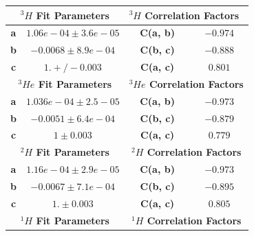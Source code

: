 \documentclass[final,5p,times,twocolumn]{elsarticle}
\begin{document}
\begin{table}[!h]
\begin{tabular}{|c|c|l|c|c|l|}
\hline
\multicolumn{3}{|c|}{\textbf{$^{3}H$ Fit Parameters}}                                & \multicolumn{3}{l|}{\textbf{$^{3}H$ Correlation Factors}}    \\ \hline
\textbf{a}              & \multicolumn{2}{c|}{$1.06e-04 \pm 3.6e-05$}                & \textbf{C(a, b)}             & \multicolumn{2}{c|}{$-0.974$} \\ \hline
\textbf{b}              & \multicolumn{2}{c|}{$-0.0068 \pm 8.9e-04$}                 & \textbf{C(b, c)}             & \multicolumn{2}{c|}{$-0.888$} \\ \hline
\textbf{c}              & \multicolumn{2}{c|}{$1. +/- 0.003$}                        & \textbf{C(a, c)}             & \multicolumn{2}{c|}{$0.801$}  \\ \hline
\multicolumn{3}{|c|}{\textbf{$^{3}He$ Fit Parameters}}                               & \multicolumn{3}{c|}{\textbf{$^{3}He$ Correlation Factors}}   \\ \hline
\textbf{a}              & \multicolumn{2}{c|}{$1.036e-04\pm 2.5-05$}                 & \textbf{C(a, b)}                      & \multicolumn{2}{c|}{$-0.973$} \\ \hline
\textbf{b}              & \multicolumn{2}{c|}{$-0.0051 \pm 6.4e-04$}                 & \textbf{C(b, c)}                      & \multicolumn{2}{c|}{$-0.879$} \\ \hline
\textbf{c}              & \multicolumn{2}{c|}{$1 \pm 0.003$}                         & \textbf{C(a, c)}                     & \multicolumn{2}{c|}{$0.779$}  \\ \hline
\multicolumn{3}{|c|}{\textbf{$^{2}H$ Fit Parameters}}                                & \multicolumn{3}{c|}{\textbf{$^{2}H$ Correlation Factors}}    \\ \hline
\textbf{a}              & \multicolumn{2}{c|}{$1.16e-04 \pm 2.9e-05$} & \textbf{C(a, b)}             & \multicolumn{2}{c|}{$-0.973$} \\ \hline
\textbf{b}              & \multicolumn{2}{c|}{$-0.0067 \pm 7.1e-04$}                 & \textbf{C(b, c)}             & \multicolumn{2}{c|}{$-0.895$} \\ \hline
\textbf{c}              & \multicolumn{2}{c|}{$1. \pm 0.003$}                        & \textbf{C(a, c)}             & \multicolumn{2}{c|}{$0.805$}  \\ \hline
\multicolumn{3}{|c|}{\textbf{$^{1}H$ Fit Parameters}}                                & \multicolumn{3}{c|}{\textbf{$^{1}H$ Correlation Factors}}    \\ \hline

\end{tabular}
\end{table}
\end{document}
